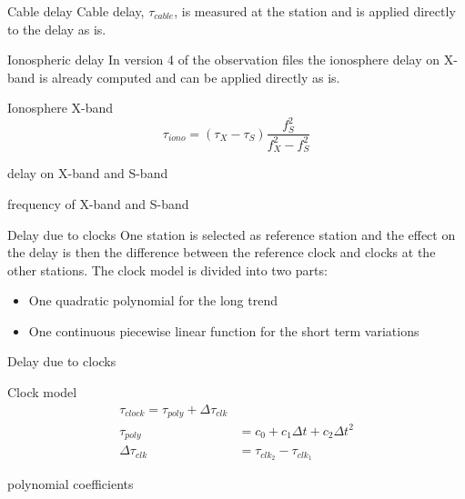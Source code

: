\documentclass[14pt,table,t, c]{beamer}
\begin{document}
\begin{frame}{Cable delay}
Cable delay, $\tau_{cable}$, is measured at the station and is applied directly to the delay as is.
\end{frame}

\begin{frame}{Ionospheric delay}
In version 4 of the observation files the ionosphere delay on X-band is already computed and can be applied directly as
is.
\vspace*{\baselineskip}
\begin{block}{Ionosphere X-band}
\vspace*{-\baselineskip}\setlength\belowdisplayskip{0pt}\setlength\abovedisplayskip{0pt}
\begin{equation*}
\tau_{iono} = (\tau_X - \tau_S) \frac{f_S^2}{f_X^2 - f_S^2}
\end{equation*}
\end{block}
\begin{description}
\item[$\tau_X, \tau_S$] delay on X-band and S-band
\item[$f_X, f_S$] frequency of X-band and S-band
\end{description}
\end{frame}

\begin{frame}{Delay due to clocks}
One station is selected as reference station and the effect on the delay is then the difference between the reference
clock and clocks at the other stations. The clock model is divided into two parts:
\vspace*{\baselineskip}
\begin{itemize}
  \item One quadratic polynomial for the long trend
  \item One continuous piecewise linear function for the short term variations
\end{itemize}
\end{frame}

\begin{frame}{Delay due to clocks}
\begin{block}{Clock model}
\vspace*{-\baselineskip}\setlength\belowdisplayskip{0pt}\setlength\abovedisplayskip{0pt}
\begin{align*}
\tau_{clock} = \tau_{poly} + \Delta\tau_{clk} \\
\tau_{poly} &= c_0 + c_1\Delta t + c_2\Delta t^2 \\
\Delta\tau_{clk} &= \tau_{clk_2} - \tau_{clk_1}
\end{align*}
\end{block}
\begin{description}[$a_j, b_j$]
\item[$c_i$] polynomial coefficients
\end{description}
\end{frame}
\end{document}
